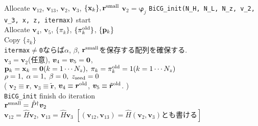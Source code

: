 \documentclass[12pt,titlepage]{jarticle}
\renewenvironment{leftbar}{%
  \def\FrameCommand{\vrule width 1pt \hspace{0pt}}%
  \MakeFramed {\advance\hsize-\width \FrameRestore}}%
 {\endMakeFramed}
\begin{document}
\noindent
Allocate ${\boldsymbol v}_{1 2}$, ${\boldsymbol v}_{1 3}$, 
${\boldsymbol v}_2$, ${\boldsymbol v}_3$, $\{{\bf x}_k\}, {\bf r}^{\rm small}$
${\boldsymbol v}_2 = {\boldsymbol \varphi_j}$
\vspace{-1em}
\begin{leftbar}
  \noindent
  \verb|BiCG_init(N_H, N_L, N_z, v_2, v_3, x, z, itermax)| start
  \\ \hspace{0.5cm}
  Allocate ${\boldsymbol v}_4$, ${\boldsymbol v}_5$, $\{\pi_k\}$, $\{\pi_k^{\rm old}\}$, $\{{\bf p}_k\}$
  \\ \hspace{0.5cm}
  Copy $\{z_k\}$
  \\ \hspace{0.5cm}
  \verb|itermax|$\neq$\verb|0|ならば$\alpha$, $\beta$, ${\bf r}^{\rm small}$を保存する配列を確保する.
  \\ \hspace{0.5cm}
  ${\boldsymbol v}_3 = {\boldsymbol v}_2$(任意),
  ${\boldsymbol v}_4 = {\boldsymbol v}_5 = {\bf 0}$,
  \\ \hspace{0.5cm}
  ${\bf p}_{k} = {\bf x}_k = {\bf 0}(k=1 \cdots N_z),\; \pi_k=\pi_k^{\rm old} = 1(k=1 \cdots N_z)$ 
  \\ \hspace{0.5cm}
  $\rho = 1,\; \alpha = 1,\; \beta=0,\; z_{\rm seed}=0$ 
  \\ \hspace{0.5cm}
  (
  ${\boldsymbol v}_2 \equiv {\boldsymbol r}$, 
  ${\boldsymbol v}_3 \equiv {\tilde {\boldsymbol r}}$, 
  ${\boldsymbol v}_4 \equiv {\boldsymbol r}^{\rm old}$,
  ${\boldsymbol v}_5 \equiv {\tilde {\boldsymbol r}}^{\rm old}$. )
  \\
  \verb|BiCG_init| finish
\end{leftbar}
\vspace{-1em}
\noindent
do iteration
\\\hspace{0.5cm}
${\bf r}^{\rm small} = {\hat P}^\dagger {\boldsymbol v}_2$
\\\hspace{0.5cm}
${\boldsymbol v}_{1 2} = {\hat H} {\boldsymbol v}_2$, 
  ${\boldsymbol v}_{1 3} = {\hat H} {\boldsymbol v}_3$  
$[ ({\boldsymbol v}_{1 2}, {\boldsymbol v}_{1 3}) = {\hat H}
  ({\boldsymbol v}_2, {\boldsymbol v}_3)とも書ける]$
\vspace{-1em}
\end{document}
